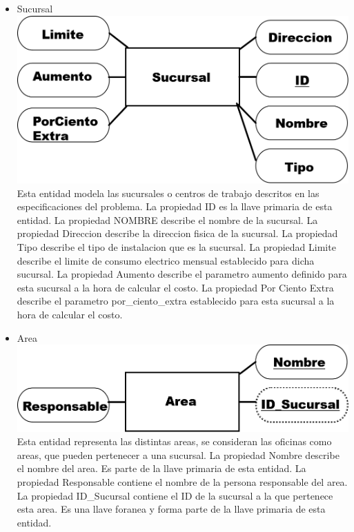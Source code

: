\documentclass{article}
\begin{document}
\begin{itemize}
\item Sucursal
\includegraphics[scale=0.25]{Imagenes/Informe1/EntidadSucursal.png}
Esta entidad modela las sucursales o centros de trabajo descritos en las especificaciones del problema.
La propiedad ID es la llave primaria de esta entidad.
La propiedad NOMBRE describe el nombre de la sucursal.
La propiedad Direccion describe la direccion fisica de la sucursal.
La propiedad Tipo describe el tipo de instalacion que es la sucursal.
La propiedad Limite describe el limite de consumo electrico mensual establecido para dicha sucursal.
La propiedad Aumento describe el parametro aumento definido para esta sucursal a la hora de calcular el costo.
La propiedad Por Ciento Extra describe el parametro por\_ciento\_extra establecido para esta sucursal a la hora de calcular el costo.
\item Area
\includegraphics[scale=0.25]{Imagenes/Informe1/EntidadArea.png}
Esta entidad representa las distintas areas, se consideran las oficinas como areas, que pueden pertenecer a una sucursal.
La propiedad Nombre describe el nombre del area. Es parte de la llave primaria de esta entidad.
La propiedad Responsable contiene el nombre de la persona responsable del area.
La propiedad ID\_Sucursal contiene el ID de la sucursal a la que pertenece esta area. Es una llave foranea y forma parte de la llave primaria de esta entidad.


\end{itemize}
\end{document}
